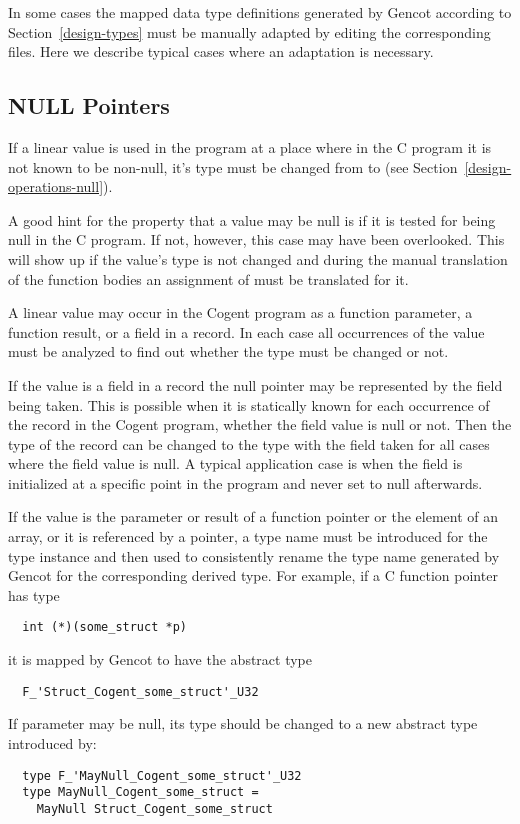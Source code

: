 In some cases the mapped data type definitions generated by Gencot according to Section~\ref{design-types} must be manually
adapted by editing the corresponding  files. Here we describe typical cases where an adaptation is
necessary.

\subsection{NULL Pointers}
\label{app-transtype-null}

If a linear value is used in the program at a place where in the C program it is not known to be non-null, it's type
must be changed from  to  (see Section~\ref{design-operations-null}).

A good hint for the property that a value may be null is if it is tested for being null in the C program. If not, however,
this case may have been overlooked. This will show up if the value's type is not changed and during the manual translation
of the function bodies an assignment of  must be translated for it.

A linear value may occur in the Cogent program as a function parameter, a function result, or a field in a record. In each case
all occurrences of the value must be analyzed to find out whether the type must be changed or not.

If the value is a field in a record the null pointer may be represented by the field being taken. This is possible when 
it is statically known for each occurrence of the record in the Cogent program, whether the field value is null or not. 
Then the type of the record can be changed to the type with the field taken for all cases where the field value is null.
A typical application case is when the field is initialized at a specific point in the program and never set to null
afterwards.

If the value is the parameter or result of a function pointer or the element of an array, or it is referenced by a pointer,
a type name must be introduced 
for the  type instance and then used to consistently rename the type name generated by Gencot for the 
corresponding derived type. For example, if a C function pointer has type
\begin{verbatim}
  int (*)(some_struct *p)
\end{verbatim}
it is mapped by Gencot to have the abstract type
\begin{verbatim}
  F_'Struct_Cogent_some_struct'_U32
\end{verbatim}
If parameter  may be null, its type should be changed to a new abstract type introduced by:
\begin{verbatim}
  type F_'MayNull_Cogent_some_struct'_U32
  type MayNull_Cogent_some_struct = 
    MayNull Struct_Cogent_some_struct
\end{verbatim}

